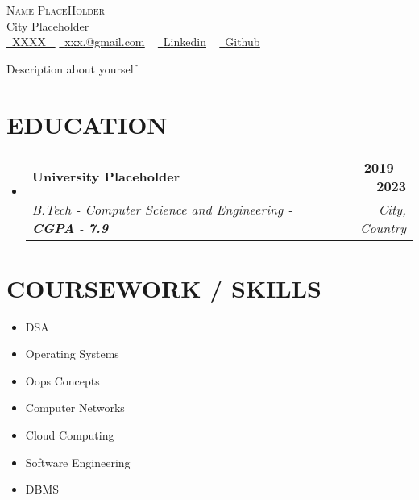 \documentclass[letterpaper,11pt]{article}
\makeatletter
\newcommand{\resumeSubheading}[4]{
  \vspace{-2pt}\item
    \begin{tabular*}{1.0\textwidth}[t]{l@{\extracolsep{\fill}}r}
      \textbf{\large#1} & \textbf{\small #2} \\
      \textit{\large#3} & \textit{\small #4} \\
      
    \end{tabular*}\vspace{-7pt}
}
\newcommand{\resumeSubHeadingListStart}{\begin{itemize}[leftmargin=0.0in, label={}]}
\newcommand{\resumeSubHeadingListEnd}{\end{itemize}}
\makeatother
\begin{document}


\begin{center}
    {\Huge \scshape Name PlaceHolder} \\ \vspace{1pt}
    City Placeholder \\ \vspace{1pt}
    \small \href{tel:#}{ \raisebox{-0.1\height}\faPhone\ \underline{XXXX} ~} \href{mailto:yourname@gmail.com}{\raisebox{-0.2\height}\faEnvelope\  \underline{xxx.@gmail.com}} ~ 
    \href{https://linkedin.com/in/placeholder}{\raisebox{-0.2\height}\faLinkedinSquare\ \underline{Linkedin}}  ~
    \href{https://github.com/placeholder}{\raisebox{-0.2\height}\faGithub\ \underline{Github}} ~
 
\end{center}
 \vspace{0.5mm}

\begin{center}
Description about yourself
\end{center}

\section{EDUCATION}
  \resumeSubHeadingListStart
    \resumeSubheading
      {University Placeholder}{2019 – 2023}
      {B.Tech - Computer Science and Engineering - \textbf{CGPA} - \textbf{7.9}}{City, Country}
  \resumeSubHeadingListEnd
  

\section{COURSEWORK / SKILLS}
        \begin{multicols}{4}
            \begin{itemize}[itemsep=-2pt, parsep=5pt]
                \item DSA
                \item Operating Systems
                \item Oops Concepts
                \item Computer Networks
                \item Cloud Computing
                \item Software Engineering
                \item DBMS
            \end{itemize}
        \end{multicols}
        \vspace*{2.0\multicolsep}
\end{document}
